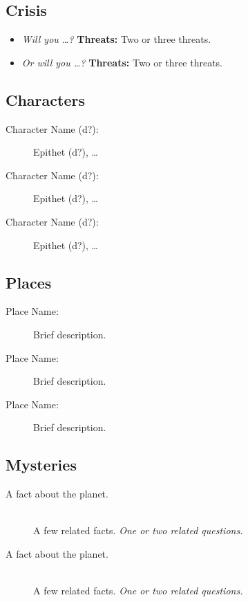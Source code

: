 \documentclass[11pt, a5paper, parskip=half-, DIV=12]{scrartcl}
\begin{document}
\subsection*{Crisis}

\begin{itemize}
	\item \textit{Will you \ldots?} \textbf{Threats:} Two or three threats.
	\item \textit{Or will you \ldots?} \textbf{Threats:} Two or three threats.
\end{itemize}

\newpage

\subsection*{Characters}
\begin{description}
	\item[Character Name (d?):] Epithet (d?), \ldots
	\item[Character Name (d?):] Epithet (d?), \ldots
	\item[Character Name (d?):] Epithet (d?), \ldots
\end{description}

\subsection*{Places}
\begin{description}
	\item[Place Name:] Brief description.
	\item[Place Name:] Brief description.
	\item[Place Name:] Brief description.
\end{description}

\subsection*{Mysteries}
\begin{description}
	\item[A fact about the planet.] \phantom{a} \\ A few related facts. \textit{One or two related questions.}
	\item[A fact about the planet.] \phantom{a} \\ A few related facts. \textit{One or two related questions.}
\end{description}

\newpage
\end{document}
